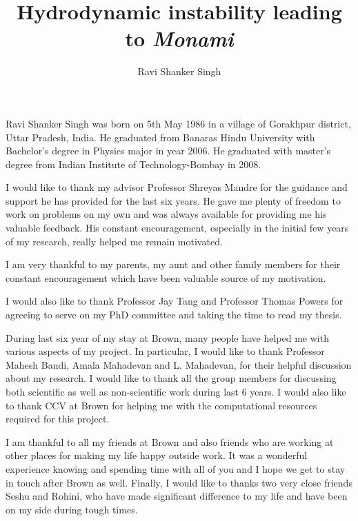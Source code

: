 \documentclass[12pt]{report}   %
\title{
Hydrodynamic instability leading to \textit{Monami}
}
\author{Ravi Shanker Singh}
\begin{document}
\doublespacing
\begin{preliminaries}
\maketitle

\copyrightpage

\begin{signature}
\end{signature}

\begin{vita}
  Ravi Shanker Singh was born on 5th May 1986 in a village of Gorakhpur district, Uttar Pradesh, India. He graduated from Banaras Hindu University with Bachelor's degree in Physics major in year 2006. He graduated with master's degree from Indian Institute of Technology-Bombay in 2008.
\end{vita}

\begin{acknowledgments}
 I would like to thank my advisor Professor Shreyas Mandre for the guidance and
support he has provided for the last six years. He gave me plenty of freedom to work on problems on my own and was always available for 
providing me his valuable feedback. His constant encouragement,
especially in the initial few years of my research, really helped me remain motivated.

I am very thankful to my parents, my aunt and other family members for their constant encouragement which have been valuable source of my motivation.

I would also like to thank Professor Jay Tang and Professor Thomas Powers for agreeing to serve on my
PhD committee and taking the time to read my thesis.


During last six year of my stay at Brown, many people have helped me with various aspects of my project. In particular, I would like to thank Professor Mahesh Bandi, Amala Mahadevan and L. Mahadevan, for their helpful discussion about my research. I would like to thank all the group members for discussing both scientific as well as non-scientific work during last 6 years. I would also like to thank CCV at Brown for helping me with the computational resources required for this project.

I am thankful to all my friends at Brown and also friends who are working at other places for making my life happy outside work. It was a
wonderful experience knowing and spending time with all of you and I hope we get to stay in touch
after Brown as well. Finally, I would like to thanks two very close friends Seshu and Rohini, who have made significant difference to my life and have been on my side during tough times.


\end{acknowledgments}
\end{preliminaries}
\end{document}
